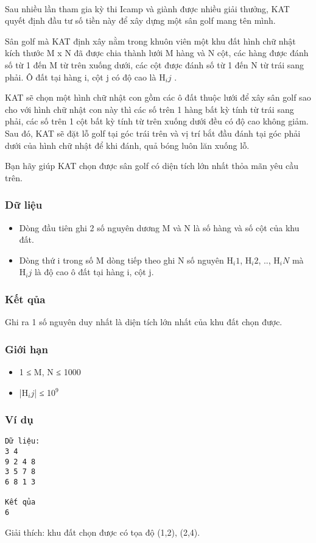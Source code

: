 

 

Sau nhiều lần tham gia kỳ thi Icamp và giành được nhiều giải thưởng, KAT quyết định đầu tư số tiền này để xây dựng một sân golf mang tên mình.

Sân golf mà KAT định xây nằm trong khuôn viên một khu đất hình chữ nhật kích thước M x N đã được chia thành lưới M hàng và N cột, các hàng được đánh số từ 1 đến M từ trên xuống dưới, các cột được đánh số từ 1 đến N từ trái sang phải. Ô đất tại hàng i, cột j có độ cao là H$_ij $ .

KAT sẽ chọn một hình chữ nhật con gồm các ô đất thuộc lưới để xây sân golf sao cho với hình chữ nhật con này thì các số trên 1 hàng bất kỳ tính từ trái sang phải, các số trên 1 cột bất kỳ tính từ trên xuống dưới đều có độ cao không giảm. Sau đó, KAT sẽ đặt lỗ golf tại góc trái trên và vị trí bắt đầu đánh tại góc phải dưới của hình chữ nhật để khi đánh, quả bóng luôn lăn xuống lỗ.

Bạn hãy giúp KAT chọn được sân golf có diện tích lớn nhất thỏa mãn yêu cầu trên.

\subsubsection{Dữ liệu}
\begin{itemize}
	\item Dòng đầu tiên ghi 2 số nguyên dương M và N là số hàng và số cột của khu đất.
	\item Dòng thứ i trong số M dòng tiếp theo ghi N số nguyên H$_i1$, H$_i2$, .., H$_iN $ mà H$_ij $ là độ cao ô đất tại hàng i, cột j.
\end{itemize}

\subsubsection{Kết qủa}

Ghi ra 1 số nguyên duy nhất là diện tích lớn nhất của khu đất chọn được.

\subsubsection{Giới hạn}
\begin{itemize}
	\item 1 ≤ M, N ≤ 1000
	\item |H$_ij$| ≤ 10$^9$
\end{itemize}

\subsubsection{Ví dụ}
\begin{verbatim}
Dữ liệu:
3 4
9 2 4 8
3 5 7 8
6 8 1 3

Kết qủa
6
\end{verbatim}

Giải thích: khu đất chọn được có tọa độ (1,2), (2,4).